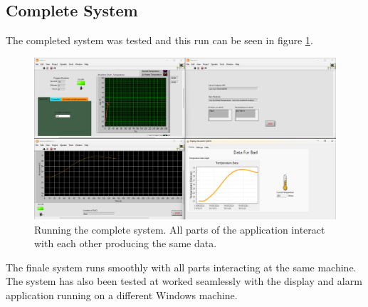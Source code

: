 \documentclass[11pt, A4paper, english]{article}
\numberwithin{equation}{section}
\begin{document}
\begin{multicols}{2}
			\subsection{Complete System}
The completed system was tested and this run can be seen in figure \ref{fig:complete}.
				\begin{figure}[H]
\includegraphics[width=\columnwidth]{Complete Setup.png}
\caption{Running the complete system. All parts of the application interact with each other producing the same data.}
\label{fig:complete}
				\end{figure}
The finale system runs smoothly with all parts interacting at the same machine. The system has also been tested at worked seamlessly with the display and alarm application running on a different Windows machine.


\end{multicols}
\end{document}
